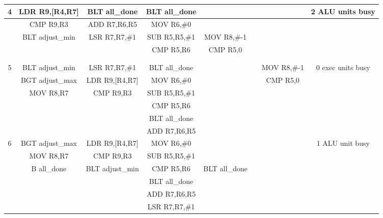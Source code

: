 \documentclass{article}
\begin{document}
{\begin{landscape}
\begin{longtable}{|c|c|c|c|c:c|c|c|}
    4 & LDR R9,[R4,R7] & BLT all\_done & BLT all\_done & & & & 2 ALU units busy \\ \hline
     & CMP R9,R3 & ADD R7,R6,R5 & MOV R6,\#0 & & & & \\ \hline
     & BLT adjust\_min & LSR R7,R7,\#1 & SUB R5,R5,\#1 & MOV R8,\#-1 &  & & \\ \hline
     &  &  & CMP R5,R6 & CMP R5,0 &  & & \\ \hline
     &  &  & &  &  &  & \\ \hline
     &  &  & &  &  &  & \\ \hline \hline
     
    5 & BLT adjust\_min & LSR R7,R7,\#1 & BLT all\_done & & & MOV R8,\#-1 & 0 exec units busy \\ \hline
     & BGT adjust\_max & LDR R9,[R4,R7] & MOV R6,\#0 & & & CMP R5,0 & \\ \hline
     & MOV R8,R7 & CMP R9,R3 & SUB R5,R5,\#1 & &  & & \\ \hline
     &  &  & CMP R5,R6 & &  & & \\ \hline
     &  &  & BLT all\_done &  &  &  & \\ \hline
     &  &  & ADD R7,R6,R5 &  &  &  & \\ \hline \hline
     
    6 & BGT adjust\_max & LDR R9,[R4,R7] & MOV R6,\#0 & & & & 1 ALU unit busy \\ \hline
     & MOV R8,R7 & CMP R9,R3 & SUB R5,R5,\#1 & & & & \\ \hline
     & B all\_done & BLT adjust\_min & CMP R5,R6 & BLT all\_done &  & & \\ \hline
     &  &  & BLT all\_done & &  & & \\ \hline
     &  &  & ADD R7,R6,R5 &  &  &  & \\ \hline
     &  &  & LSR R7,R7,\#1 &  &  &  & \\ \hline \hline
     

\end{longtable}
\end{landscape}}
\end{document}
